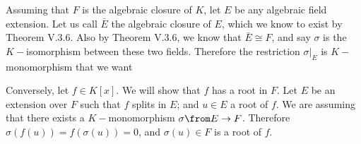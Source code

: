 Assuming that $F$ is the algebraic closure of $K$, let $E$ be any algebraic field extension.
Let us call $\bar E$ the algebraic closure of $E$, which we know to exist by Theorem V.3.6.
Also by  Theorem V.3.6, we know that $\bar E \cong F$, and say $\sigma$ is the $K-$isomorphism between these two fields.
Therefore the restriction $\sigma|_E$ is $K-$monomorphism that we want

Conversely, let $f\in K[x]$. We will show that $f$ has a root in $F$.
Let $E$ be an extension over $F$ such that $f$ splits in $E$; and $u\in E$ a root of $f$.
We are assuming that there exists a $K-$monomorphism $\sigma\from E\to F$.
Therefore $\sigma(f(u))=f(\sigma(u))=0$, and $\sigma(u)\in F$ is a root of $f$. 


